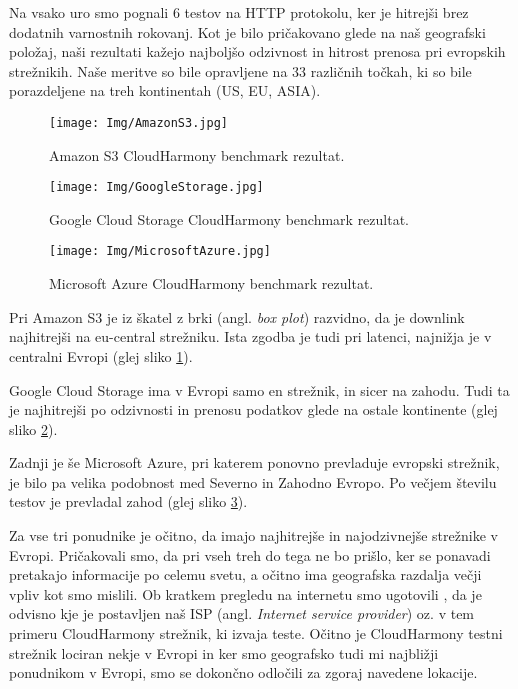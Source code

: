 \documentclass[11pt]{article}
\begin{document}
Na vsako uro smo pognali 6 testov na HTTP protokolu, ker je hitrejši brez dodatnih varnostnih rokovanj.
Kot je bilo pričakovano glede na naš geografski položaj, naši rezultati kažejo najboljšo odzivnost in hitrost prenosa pri evropskih strežnikih. Naše meritve so bile opravljene na 33 različnih točkah, ki so bile porazdeljene na treh kontinentah (US, EU, ASIA). 

\begin{figure}[H]
    \begin{center}
        \texttt{[image: Img/AmazonS3.jpg]}
        \caption{Amazon S3 CloudHarmony benchmark rezultat.}
        \label{fig:ch1}
    \end{center}
\end{figure}

\begin{figure}[H]
    \begin{center}
        \texttt{[image: Img/GoogleStorage.jpg]}
        \caption{Google Cloud Storage CloudHarmony benchmark rezultat.}
        \label{fig:ch2}
    \end{center}
\end{figure}

\begin{figure}[H]
    \begin{center}
        \texttt{[image: Img/MicrosoftAzure.jpg]}
        \caption{Microsoft Azure CloudHarmony benchmark rezultat.}
        \label{fig:ch3}
    \end{center}
\end{figure}

Pri Amazon S3 je iz škatel z brki (angl. \textit{box plot}) razvidno, da je downlink najhitrejši na eu-central strežniku. Ista zgodba je tudi pri latenci, najnižja je v centralni Evropi (glej sliko \ref{fig:ch1}).

Google Cloud Storage ima v Evropi samo en strežnik, in sicer na zahodu. Tudi ta je najhitrejši po odzivnosti in prenosu podatkov glede na ostale kontinente (glej sliko \ref{fig:ch2}).

Zadnji je še Microsoft Azure, pri katerem ponovno prevladuje evropski strežnik, je bilo pa velika podobnost med Severno in Zahodno Evropo. Po večjem številu testov je prevladal zahod (glej sliko \ref{fig:ch3}).

Za vse tri ponudnike je očitno, da imajo najhitrejše in najodzivnejše strežnike v Evropi. Pričakovali smo, da pri vseh treh do tega ne bo prišlo, ker se ponavadi pretakajo informacije po celemu svetu, a očitno ima geografska razdalja večji vpliv kot smo mislili. Ob kratkem pregledu na internetu smo ugotovili \cite{serverdistance}, da je odvisno kje je postavljen naš ISP (angl. \textit{Internet service provider}) oz. v tem primeru CloudHarmony strežnik, ki izvaja teste. Očitno je CloudHarmony testni strežnik lociran nekje v Evropi in ker smo geografsko tudi mi najbližji ponudnikom v Evropi, smo se dokončno odločili za zgoraj navedene lokacije.
\end{document}
